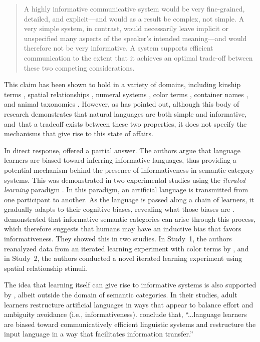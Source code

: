 \documentclass[doc,biblatex]{apa7}
\begin{document}
	\begin{quote}
	A highly informative communicative system would be very fine-grained, detailed, and explicit---and would as a result be complex, not simple. A very simple system, in contrast, would necessarily leave implicit or unspecified many aspects of the speaker's intended meaning---and would therefore not be very informative. A system supports efficient communication to the extent that it achieves an optimal trade-off between these two competing considerations.
	\end{quote}

\noindent This claim has been shown to hold in a variety of domains, including kinship terms \parencite{KempRegier:2012}, spatial relationships \parencite{Khetarpal:2013}, numeral systems \parencite{Xu:2014}, color terms \parencite{Regier:2015}, container names \parencite{Xu:2016}, and animal taxonomies \parencite{Zaslavsky:2019}. However, as \textcite[p.~989]{Levinson:2012} has pointed out, although this body of research demonstrates that natural languages are both simple and informative, and~that a tradeoff exists between these two properties, it does not specify the mechanisms that give rise to this state of affairs.

In direct response, \textcite{Carstensen:2015} offered a partial answer. The authors argue that language learners are biased toward inferring informative languages, thus providing a potential mechanism behind the presence of informativeness in semantic category systems. This was demonstrated in two experimental studies using the \textit{iterated learning} paradigm \parencite{Kirby:2008}. In this paradigm, an artificial language is transmitted from one participant to another. As the language is passed along a chain of learners, it gradually adapts to their cognitive biases, revealing what those biases are \parencite[for reviews, see][]{Kirby:2014,Tamariz:2017}. \textcite{Carstensen:2015} demonstrated that informative semantic categories can arise through this process, which therefore suggests that humans may have an inductive bias that favors informativeness. They showed this in two studies. In Study~1, the authors reanalyzed data from an iterated learning experiment with color terms by \textcite{Xu:2013}, and in Study~2, the authors conducted a novel iterated learning experiment using spatial relationship stimuli.

The idea that learning itself can give rise to informative systems is also supported by \textcite{Fedzechkina:2012}, albeit outside the domain of semantic categories. In their studies, adult learners restructure artificial languages in ways that appear to balance effort and ambiguity avoidance (i.e., informativeness). \textcite[][p.~17900]{Fedzechkina:2012} conclude that, ``...language learners are biased toward communicatively efficient linguistic systems and restructure the input language in a way that facilitates information transfer.''
\end{document}
